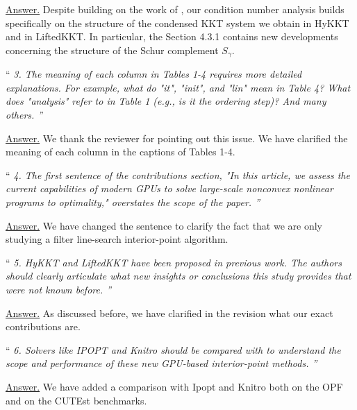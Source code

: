 \documentclass[10pt,a4paper]{article}
\newenvironment{quotereviewer}{\vspace{.5cm}{\underline\reviewername} ``\it\footnotesize}{''}
\newcommand{\answer}{\vspace{1mm}\underline{Answer.} }
\begin{document}
\answer
Despite building on the work of \cite{wright1998ill,wright2001effects},
our condition number analysis builds specifically on the structure of
the condensed KKT system we obtain in HyKKT and in LiftedKKT. In particular,
the Section 4.3.1 contains new developments concerning the structure of the
Schur complement $S_\gamma$.

\begin{quotereviewer}
3. The meaning of each column in Tables 1-4 requires more detailed explanations. For example,
what do "it", "init", and "lin" mean in Table 4? What does "analysis" refer to in Table 1
(e.g., is it the ordering step)? And many others.
\end{quotereviewer}

\answer
We thank the reviewer for pointing out this issue. We have clarified
the meaning of each column in the captions of Tables 1-4.

\begin{quotereviewer}
4. The ﬁrst sentence of the contributions section, "In this article, we assess the current capabilities of modern GPUs to solve large-scale nonconvex nonlinear programs to optimality,"
overstates the scope of the paper.
\end{quotereviewer}

\answer We have changed the sentence to clarify the fact that we are only studying
a filter line-search interior-point algorithm.

\begin{quotereviewer}
5. HyKKT and LiftedKKT have been proposed in previous work. The authors should clearly
articulate what new insights or conclusions this study provides that were not known before.
\end{quotereviewer}

\answer As discussed before, we have clarified in the revision what our exact
contributions are.

\begin{quotereviewer}
6. Solvers like IPOPT and Knitro should be compared with to understand the scope and performance of these new GPU-based interior-point methods.
\end{quotereviewer}

\answer
We have added a comparison with Ipopt and Knitro both on the OPF and on the CUTEst benchmarks.



\end{document}
